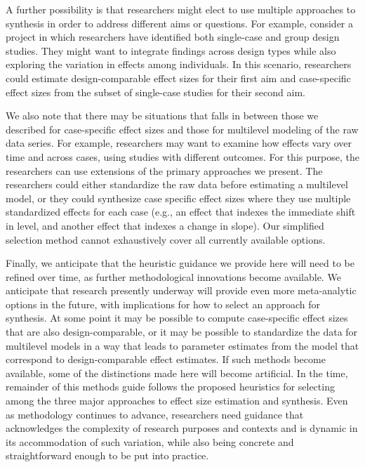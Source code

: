 \documentclass[
]{book}
\begin{document}
A further possibility is that researchers might elect to use multiple approaches to synthesis in order to address different aims or questions.
For example, consider a project in which researchers have identified both single-case and group design studies.
They might want to integrate findings across design types while also exploring the variation in effects among individuals.
In this scenario, researchers could estimate design-comparable effect sizes for their first aim and case-specific effect sizes from the subset of single-case studies for their second aim.

We also note that there may be situations that falls in between those we described for case-specific effect sizes and those for multilevel modeling of the raw data series.
For example, researchers may want to examine how effects vary over time and across cases, using studies with different outcomes.
For this purpose, the researchers can use extensions of the primary approaches we present.
The researchers could either standardize the raw data before estimating a multilevel model, or they could synthesize case specific effect sizes where they use multiple standardized effects for each case (e.g., an effect that indexes the immediate shift in level, and another effect that indexes a change in slope).
Our simplified selection method cannot exhaustively cover all currently available options.

Finally, we anticipate that the heuristic guidance we provide here will need to be refined over time, as further methodological innovations become available.
We anticipate that research presently underway will provide even more meta-analytic options in the future, with implications for how to select an approach for synthesis.
At some point it may be possible to compute case-specific effect sizes that are also design-comparable, or it may be possible to standardize the data for multilevel models in a way that leads to parameter estimates from the model that correspond to design-comparable effect estimates.
If such methods become available, some of the distinctions made here will become artificial.
In the time, remainder of this methods guide follows the proposed heuristics for selecting among the three major approaches to effect size estimation and synthesis.
Even as methodology continues to advance, researchers need guidance that acknowledges the complexity of research purposes and contexts and is dynamic in its accommodation of such variation, while also being concrete and straightforward enough to be put into practice.
\end{document}
